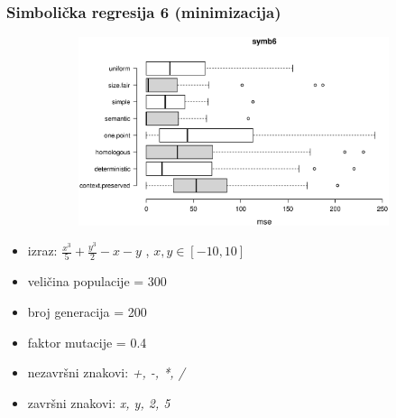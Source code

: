 \documentclass{beamer}
\begin{document}
\begin{frame}
\frametitle{Simbolička regresija 6 (minimizacija)}


\begin{figure}[!htb]
\begin{figure}[H]
	\centering
	\includegraphics[trim=4cm 5.5cm 0cm 3.5cm, scale=0.3]{./boxPlots/symb6.eps}
\end{figure}

\endminipage
{}
\endminipage
\end{figure}


\begin{itemize}
\item{izraz: $\frac{x^3}{5} + \frac{y^3}{2} - x - y$ , $x, y \in [-10, 10]$}
\item{veličina populacije = 300}
\item{broj generacija = 200}
\item{faktor mutacije = 0.4}
\item{nezavršni znakovi: \textit{+, -, *, /}}
\item{završni znakovi: \textit{x, y, 2, 5}}
\end{itemize}
\end{frame}
\end{document}
